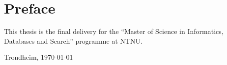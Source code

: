 \section*{Preface}
This thesis is the final delivery for the ``Master of Science in Informatics, Databases and Search'' programme at NTNU.


\vfill

\hfill \thesisAuthor

\hfill Trondheim, \today
